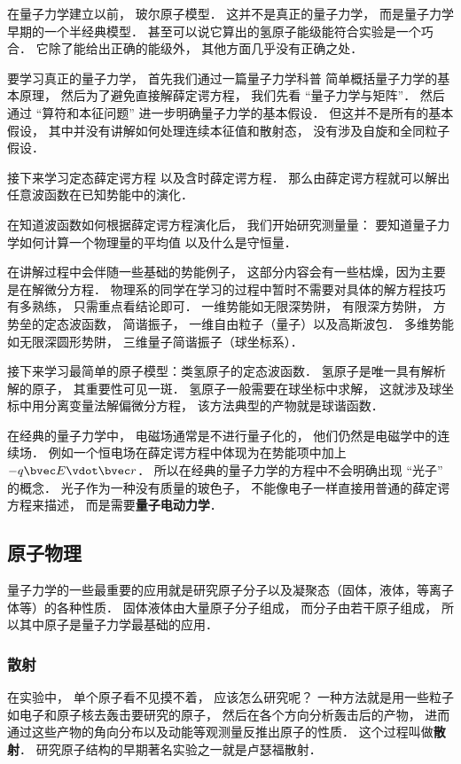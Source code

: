 在量子力学建立以前， 玻尔原子模型． 这并不是真正的量子力学， 而是量子力学早期的一个半经典模型． 甚至可以说它算出的氢原子能级能符合实验是一个巧合． 它除了能给出正确的能级外， 其他方面几乎没有正确之处．

要学习真正的量子力学， 首先我们通过一篇量子力学科普 简单概括量子力学的基本原理， 然后为了避免直接解薛定谔方程， 我们先看 “量子力学与矩阵”． 然后通过 “算符和本征问题” 进一步明确量子力学的基本假设． 但这并不是所有的基本假设， 其中并没有讲解如何处理连续本征值和散射态， 没有涉及自旋和全同粒子假设．

接下来学习定态薛定谔方程 以及含时薛定谔方程． 那么由薛定谔方程就可以解出任意波函数在已知势能中的演化．

在知道波函数如何根据薛定谔方程演化后， 我们开始研究测量量： 要知道量子力学如何计算一个物理量的平均值 以及什么是守恒量．

在讲解过程中会伴随一些基础的势能例子， 这部分内容会有一些枯燥，因为主要是在解微分方程． 物理系的同学在学习的过程中暂时不需要对具体的解方程技巧有多熟练， 只需重点看结论即可． 一维势能如无限深势阱， 有限深方势阱， 方势垒的定态波函数， 简谐振子， 一维自由粒子（量子）以及高斯波包． 多维势能如无限深圆形势阱， 三维量子简谐振子（球坐标系）．

接下来学习最简单的原子模型：类氢原子的定态波函数． 氢原子是唯一具有解析解的原子， 其重要性可见一斑． 氢原子一般需要在球坐标中求解， 这就涉及球坐标中用分离变量法解偏微分方程， 该方法典型的产物就是球谐函数．

在经典的量子力学中， 电磁场通常是不进行量子化的， 他们仍然是电磁学中的连续场． 例如一个恒电场在薛定谔方程中体现为在势能项中加上 $-q\bvec E \vdot \bvec r$． 所以在经典的量子力学的方程中不会明确出现 “光子” 的概念． 光子作为一种没有质量的玻色子， 不能像电子一样直接用普通的薛定谔方程来描述， 而是需要\textbf{量子电动力学}．

\subsection{原子物理}
量子力学的一些最重要的应用就是研究原子分子以及凝聚态（固体，液体，等离子体等）的各种性质． 固体液体由大量原子分子组成， 而分子由若干原子组成， 所以其中原子是量子力学最基础的应用．

\subsubsection{散射}
在实验中， 单个原子看不见摸不着， 应该怎么研究呢？ 一种方法就是用一些粒子如电子和原子核去轰击要研究的原子， 然后在各个方向分析轰击后的产物， 进而通过这些产物的角向分布以及动能等观测量反推出原子的性质． 这个过程叫做\textbf{散射}． 研究原子结构的早期著名实验之一就是卢瑟福散射．

